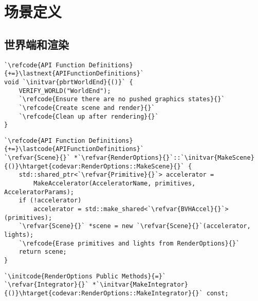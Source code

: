 \section{场景定义}\label{sec:场景定义}

\subsection{世界端和渲染}\label{sub:世界端和渲染}
\begin{lstlisting}
`\refcode{API Function Definitions}{+=}\lastnext{APIFunctionDefinitions}`
void `\initvar{pbrtWorldEnd}{()}` {
    VERIFY_WORLD("WorldEnd");
    `\refcode{Ensure there are no pushed graphics states}{}`
    `\refcode{Create scene and render}{}`
    `\refcode{Clean up after rendering}{}`
}
\end{lstlisting}

\begin{lstlisting}
`\refcode{API Function Definitions}{+=}\lastcode{APIFunctionDefinitions}`
`\refvar{Scene}{}` *`\refvar{RenderOptions}{}`::`\initvar{MakeScene}{()}\htarget{codevar:RenderOptions::MakeScene}{}` {
    std::shared_ptr<`\refvar{Primitive}{}`> accelerator =
        MakeAccelerator(AcceleratorName, primitives, AcceleratorParams);
    if (!accelerator)
        accelerator = std::make_shared<`\refvar{BVHAccel}{}`>(primitives);
    `\refvar{Scene}{}` *scene = new `\refvar{Scene}{}`(accelerator, lights);
    `\refcode{Erase primitives and lights from RenderOptions}{}`
    return scene;
}
\end{lstlisting}

\begin{lstlisting}
`\initcode{RenderOptions Public Methods}{=}` 
`\refvar{Integrator}{}` *`\initvar{MakeIntegrator}{()}\htarget{codevar:RenderOptions::MakeIntegrator}{}` const;
\end{lstlisting}